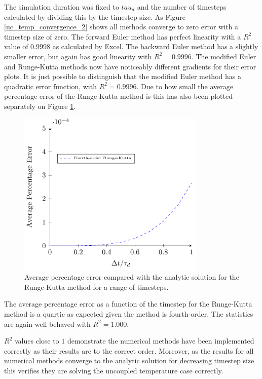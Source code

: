\documentclass[../Interim_Report_Master]{subfiles}
\begin{document}
The simulation duration was fixed to $tau_d$ and the number of timesteps calculated by dividing this by the timestep size. As Figure \ref{uc_temp_convergence_2} shows all methods converge to zero error with a timestep size of zero. The forward Euler method has perfect linearity with a $R^2$ value of $0.9998$ as calculated by Excel. The backward Euler method has a slightly smaller error, but again has good linearity with $R^2=0.9996$. The modified Euler and Runge-Kutta methods now have noticeably different gradients for their error plots. It is just possible to distinguish that the modified Euler method has a quadratic error function, with $R^2=0.9996$. Due to how small the average percentage error of the Runge-Kutta method is this has also been plotted separately on Figure \ref{uc_temp_convergence_3}.
\begin{figure}[h]
	\centering
	\includegraphics[width=0.8\textwidth]{./Diagrams/Uncoupled_Temp_Convergence_2/Uncoupled_Temp_Convergence_3.pdf}
	\caption{Average percentage error compared with the analytic solution for the Runge-Kutta method for a range of timesteps.}
	\label{uc_temp_convergence_3}
\end{figure}

The average percentage error as a function of the timestep for the Runge-Kutta method is a quartic as expected given the method is fourth-order. The statistics are again well behaved with $R^2=1.000$. 

$R^2$ values close to $1$ demonstrate the numerical methods have been implemented correctly as their results are to the correct order. Moreover, as the results for all numerical methods converge to the analytic solution for decreasing timestep size this verifies they are solving the uncoupled temperature case correctly.
\end{document}
